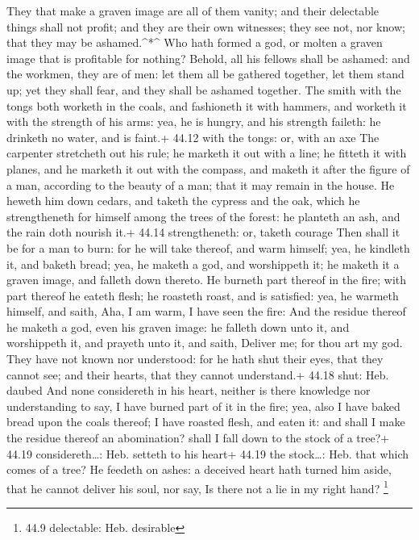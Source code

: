  They that make a graven image are all of them vanity; and
their delectable things shall not profit; and they are their own
witnesses; they see not, nor know; that they may be ashamed.\^{}*\^{}
 Who hath formed a god, or molten a graven image that is
profitable for nothing?  Behold, all his fellows shall be
ashamed: and the workmen, they are of men: let them all be gathered
together, let them stand up; yet they shall fear, and they shall be
ashamed together.  The smith with the tongs both worketh in
the coals, and fashioneth it with hammers, and worketh it with the
strength of his arms: yea, he is hungry, and his strength faileth: he
drinketh no water, and is faint.+ 44.12 with the tongs: or, with an axe
 The carpenter stretcheth out his rule; he marketh it out
with a line; he fitteth it with planes, and he marketh it out with the
compass, and maketh it after the figure of a man, according to the
beauty of a man; that it may remain in the house.  He
heweth him down cedars, and taketh the cypress and the oak, which he
strengtheneth for himself among the trees of the forest: he planteth an
ash, and the rain doth nourish it.+ 44.14 strengtheneth: or, taketh
courage  Then shall it be for a man to burn: for he will
take thereof, and warm himself; yea, he kindleth it, and baketh bread;
yea, he maketh a god, and worshippeth it; he maketh it a graven image,
and falleth down thereto.  He burneth part thereof in the
fire; with part thereof he eateth flesh; he roasteth roast, and is
satisfied: yea, he warmeth himself, and saith, Aha, I am warm, I have
seen the fire:  And the residue thereof he maketh a god,
even his graven image: he falleth down unto it, and worshippeth it, and
prayeth unto it, and saith, Deliver me; for thou art my god.
 They have not known nor understood: for he hath shut their
eyes, that they cannot see; and their hearts, that they cannot
understand.+ 44.18 shut: Heb. daubed  And none considereth
in his heart, neither is there knowledge nor understanding to say, I
have burned part of it in the fire; yea, also I have baked bread upon
the coals thereof; I have roasted flesh, and eaten it: and shall I make
the residue thereof an abomination? shall I fall down to the stock of a
tree?+ 44.19 considereth\ldots: Heb. setteth to his heart+ 44.19 the
stock\ldots: Heb. that which comes of a tree?  He feedeth
on ashes: a deceived heart hath turned him aside, that he cannot deliver
his soul, nor say, Is there not a lie in my right hand? \footnote{44.9
  delectable: Heb. desirable}

